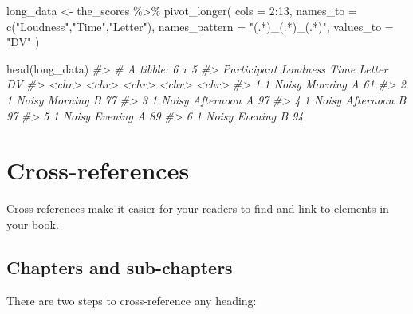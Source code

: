 \documentclass[
]{book}
\newenvironment{Shaded}{\begin{snugshade}}{\end{snugshade}}
\newcommand{\AttributeTok}[1]{\textcolor[rgb]{0.77,0.63,0.00}{#1}}
\newcommand{\CommentTok}[1]{\textcolor[rgb]{0.56,0.35,0.01}{\textit{#1}}}
\newcommand{\DecValTok}[1]{\textcolor[rgb]{0.00,0.00,0.81}{#1}}
\newcommand{\FunctionTok}[1]{\textcolor[rgb]{0.00,0.00,0.00}{#1}}
\newcommand{\NormalTok}[1]{#1}
\newcommand{\OtherTok}[1]{\textcolor[rgb]{0.56,0.35,0.01}{#1}}
\newcommand{\SpecialCharTok}[1]{\textcolor[rgb]{0.00,0.00,0.00}{#1}}
\newcommand{\StringTok}[1]{\textcolor[rgb]{0.31,0.60,0.02}{#1}}
\theoremstyle{definition}
\theoremstyle{definition}
\theoremstyle{definition}
\theoremstyle{definition}
\theoremstyle{remark}
\begin{document}
\begin{Shaded}
\begin{Highlighting}[]
\NormalTok{long\_data }\OtherTok{\textless{}{-}}\NormalTok{ the\_scores }\SpecialCharTok{\%\textgreater{}\%} \FunctionTok{pivot\_longer}\NormalTok{(}
  \AttributeTok{cols =} \DecValTok{2}\SpecialCharTok{:}\DecValTok{13}\NormalTok{,}
  \AttributeTok{names\_to =} \FunctionTok{c}\NormalTok{(}\StringTok{"Loudness"}\NormalTok{,}\StringTok{"Time"}\NormalTok{,}\StringTok{"Letter"}\NormalTok{),}
  \AttributeTok{names\_pattern =} \StringTok{"(.*)\_(.*)\_(.*)"}\NormalTok{,}
  \AttributeTok{values\_to =} \StringTok{"DV"}
\NormalTok{)}

\FunctionTok{head}\NormalTok{(long\_data)}
\CommentTok{\#\textgreater{} \# A tibble: 6 x 5}
\CommentTok{\#\textgreater{}   Participant Loudness Time      Letter DV   }
\CommentTok{\#\textgreater{}   \textless{}chr\textgreater{}       \textless{}chr\textgreater{}    \textless{}chr\textgreater{}     \textless{}chr\textgreater{}  \textless{}chr\textgreater{}}
\CommentTok{\#\textgreater{} 1 1           Noisy    Morning   A      61   }
\CommentTok{\#\textgreater{} 2 1           Noisy    Morning   B      77   }
\CommentTok{\#\textgreater{} 3 1           Noisy    Afternoon A      97   }
\CommentTok{\#\textgreater{} 4 1           Noisy    Afternoon B      97   }
\CommentTok{\#\textgreater{} 5 1           Noisy    Evening   A      89   }
\CommentTok{\#\textgreater{} 6 1           Noisy    Evening   B      94}
\end{Highlighting}
\end{Shaded}

\hypertarget{cross}{%
\chapter{Cross-references}\label{cross}}

Cross-references make it easier for your readers to find and link to elements in your book.

\hypertarget{chapters-and-sub-chapters}{%
\section{Chapters and sub-chapters}\label{chapters-and-sub-chapters}}

There are two steps to cross-reference any heading:
\end{document}
